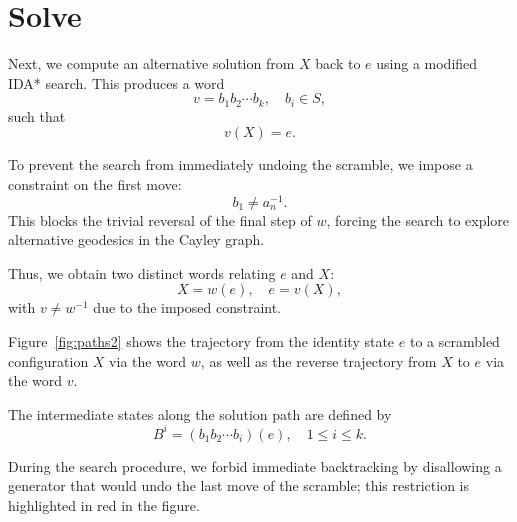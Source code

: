 \documentclass{article}
\begin{document}
\section{Solve}
Next, we compute an alternative solution from \(X\) back to \(e\) using a modified IDA* search. This produces a word
\[
	v = b_1 b_2 \cdots b_k, \quad b_i \in S,
\]
such that
\[
	v(X) = e.
\]

To prevent the search from immediately undoing the scramble, we impose a constraint on the first move:
\[
	b_1 \neq a_n^{-1}.
\]
This blocks the trivial reversal of the final step of \(w\), forcing the search to explore alternative geodesics in the Cayley graph.

Thus, we obtain two distinct words relating \(e\) and \(X\):
\[
	X = w(e), \quad e = v(X),
\]
with \(v \neq w^{-1}\) due to the imposed constraint.

Figure~\ref{fig:paths2} shows the trajectory from the identity state \(e\) to a scrambled configuration \(X\) via the word \(w\), as well as the reverse trajectory from \(X\) to \(e\) via the word \(v\).

The intermediate states along the solution path are defined by
\[
	B^i = (b_1 b_2 \cdots b_i)(e), \quad 1 \le i \le k.
\]

During the search procedure, we forbid immediate backtracking by disallowing a generator that would undo the last move of the scramble; this restriction is highlighted in red in the figure.
\end{document}
